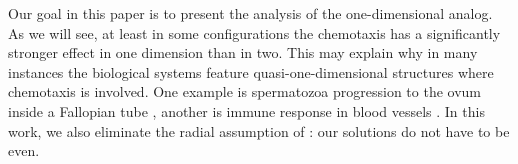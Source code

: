 \documentclass[12pt,reqno]{amsart}
\begin{document}
Our goal in this paper is to present the analysis of the one-dimensional analog. As we will see, at least in some configurations the chemotaxis has a significantly stronger effect in one dimension than in two. This may explain why in many instances
the biological systems feature quasi-one-dimensional structures where chemotaxis is involved. One example is spermatozoa progression to the ovum inside a Fallopian tube \cite{teves}, another is immune response in blood vessels \cite{manes}.
In this work, we also eliminate the radial assumption of \cite{KNRY}: our solutions do not have to be even.

\end{document}
